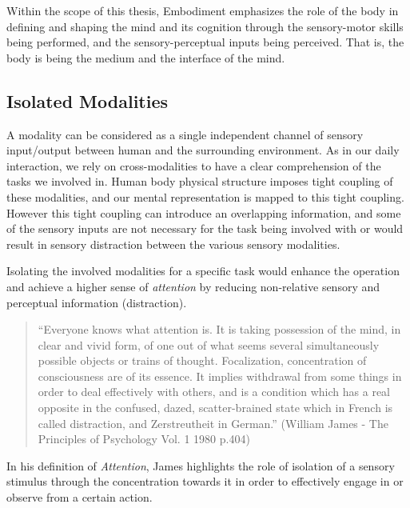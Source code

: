 Within the scope of this thesis, Embodiment emphasizes the role of the body in defining and shaping the mind and its cognition through the sensory-motor skills being performed, and the sensory-perceptual inputs being perceived. That is, the body is being the medium and the interface of the mind.

\subsection{Isolated Modalities}

A modality can be considered as a single independent channel of sensory input/output between human and the surrounding environment. As in our daily interaction, we rely on cross-modalities to have a clear comprehension of the tasks we involved in. Human body physical structure imposes tight coupling of these modalities, and our mental representation is mapped to this tight coupling. However this tight coupling can introduce an overlapping information, and some of the sensory inputs are not necessary for the task being involved with or would result in sensory distraction between the various sensory modalities.

Isolating the involved modalities for a specific task would enhance the operation and achieve a higher sense of \textit{attention} by reducing non-relative sensory and perceptual information (distraction).

\begin{quote}
``Everyone knows what attention is. It is taking possession of the mind, in clear and vivid form, of one out of what seems several simultaneously possible objects or trains of thought. Focalization, concentration of consciousness are of its essence. It implies withdrawal from some things in order to deal effectively with others, and is a condition which has a real opposite in the confused, dazed, scatter-brained state which in French is called distraction, and Zerstreutheit in German.''  (William James - The Principles of Psychology Vol. 1 1980 p.404)
\end{quote}

In his definition of \textit{Attention}, James highlights the role of isolation of a sensory stimulus through the concentration towards it in order to effectively engage in or observe from a certain action.

